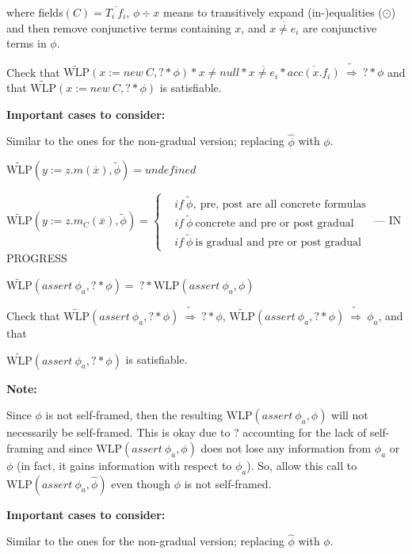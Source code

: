 \documentclass {article}
\newcommand{\fphi}{\widehat{\phi}}
\newcommand{\tphi}{\widetilde{\phi}}
\newcommand{\timp}{\ \widetilde{\Rightarrow}\ }
\newcommand{\wlp}[2]{\text{WLP}(#1,#2)}
\newcommand{\twlp}[2]{\widetilde{\text{WLP}}(#1,#2)}
\begin{document}
where fields$(C) = \overline{T_i \ f_i}$, $\phi \div x$ means to transitively expand (in-)equalities ($\odot$) and then remove conjunctive terms containing $x$, and $\overline{x \neq e_i}$ are conjunctive terms in $\phi$. 

Check that $\twlp{x := new\ C}{? \ast \phi} \ast x \neq null \ast \overline{x \neq e_i} \ast \overline{acc(x.f_i)} \timp ? \ast \phi$ and that $\twlp{x := new\ C}{? \ast \phi}$ is satisfiable.

\textbf{Important cases to consider:}

Similar to the ones for the non-gradual version; replacing $\fphi$ with $\phi$.

\vspace{0.5cm}

$\twlp{y := z.m(\overline{x})}{\tphi} = undefined$

\vspace{0.5cm}

$\twlp{y := z.m_C(\overline{x})}{\tphi} = 
	\begin{cases}
		& if \ \tphi, \ \text{pre, post are all concrete formulas} \\
		& if \ \tphi \ \text{concrete and pre or post gradual} \\
		& if \ \tphi \ \text{is gradual and pre or post gradual}
	\end{cases}
$ --- IN PROGRESS

\vspace{0.5cm}

$\twlp{assert\ \phi_a}{? \ast \phi} = \ ? \ast \wlp{assert\ \phi_a}{\phi}$

Check that $\twlp{assert\ \phi_a}{? \ast \phi} \timp ? \ast \phi$, $\twlp{assert\ \phi_a}{? \ast \phi} \timp \phi_a$, and that 

\noindent $\twlp{assert\ \phi_a}{? \ast \phi}$ is satisfiable.

\textbf{Note:}

Since $\phi$ is not self-framed, then the resulting $\wlp{assert\ \phi_a}{\phi}$ will not necessarily be self-framed. This is okay due to ? accounting for the lack of self-framing and since $\wlp{assert\ \phi_a}{\phi}$ does not lose any information from $\phi_a$ or $\phi$ (in fact, it gains information with respect to $\phi_a$). So, allow this call to $\wlp{assert\ \phi_a}{\fphi}$ even though $\phi$ is not self-framed.

\textbf{Important cases to consider:}

Similar to the ones for the non-gradual version; replacing $\fphi$ with $\phi$.
\end{document}
